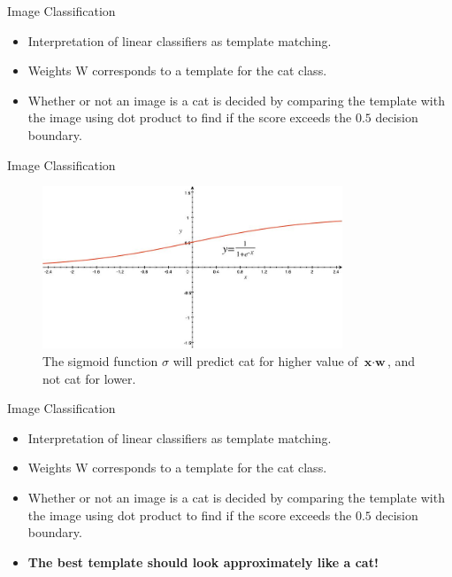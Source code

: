 \begin{frame}{Image Classification}
\begin{itemize}
    \item Interpretation of linear classifiers as template matching. 
    \item Weights W corresponds to a template for the cat class. 
    \item Whether or not an image is a cat is decided by comparing the template with the image using dot product to find if the score exceeds the $0.5$ decision boundary.
\end{itemize}
\end{frame}

\begin{frame}{Image Classification}
    \begin{figure}
    \centering
    \includegraphics[width=0.8\textwidth]{img/sigmoid.jpg}
    \caption{The sigmoid function $\sigma$ will predict cat for higher value of $\textbf{x} \cdot \textbf{w}$, and not cat for lower.}
    \end{figure}
\end{frame}

\begin{frame}{Image Classification}
\begin{itemize}
    \item Interpretation of linear classifiers as template matching. 
    \item Weights W corresponds to a template for the cat class. 
    \item Whether or not an image is a cat is decided by comparing the template with the image using dot product to find if the score exceeds the $0.5$ decision boundary.
    \item \textbf{The best template should look approximately like a cat!}
\end{itemize}
\end{frame}

